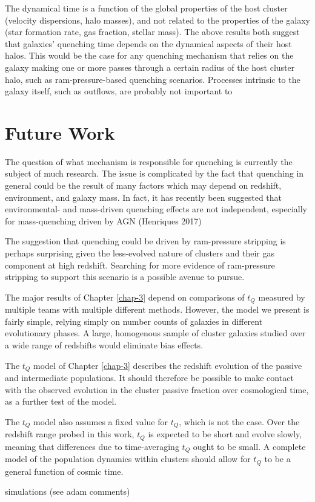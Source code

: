The dynamical time is a function of the global properties of the host cluster (velocity dispersions, halo masses), and not related to the properties of the galaxy (star formation rate, gas fraction, stellar mass).
The above results both suggest that galaxies' quenching time depends on the dynamical aspects of their host halos.
This would be the case for any quenching mechanism that relies on the galaxy making one or more passes through a certain radius of the host cluster halo, such as ram-pressure-based quenching scenarios.
Processes intrinsic to the galaxy itself, such as outflows, are probably not important to


\section{Future Work}

The question of what mechanism is responsible for quenching is currently the subject of much research.
The issue is complicated by the fact that quenching in general could be the result of many factors which may depend on redshift, environment, and galaxy mass.
In fact, it has recently been suggested that environmental- and mass-driven quenching effects are not independent, especially for mass-quenching driven by AGN (Henriques 2017)

The suggestion that quenching could be driven by ram-pressure stripping is perhaps surprising given the less-evolved nature of clusters and their gas component at high redshift.
Searching for more evidence of ram-pressure stripping to support this scenario is a possible avenue to pursue.


The major results of Chapter \ref{chap-3} depend on comparisons of $t_Q$ measured by multiple teams with multiple different methods.
However, the model we present is fairly simple, relying simply on number counts of galaxies in different evolutionary phases.
A large, homogenous sample of cluster galaxies studied over a wide range of redshifts would eliminate bias effects.

The $t_Q$ model of Chapter \ref{chap-3} describes the redshift evolution of the passive and intermediate populations.
It should therefore be possible to make contact with the observed evolution in the cluster passive fraction over cosmological time, as a further test of the model.

The $t_Q$ model also assumes a fixed value for $t_Q$, which is not the case.
Over the redshift range probed in this work, $t_Q$ is expected to be short and evolve slowly, meaning that differences due to time-averaging $t_Q$ ought to be small.
A complete model of the population dynamics within clusters should allow for $t_Q$ to be a general function of cosmic time.


simulations (see adam comments)

